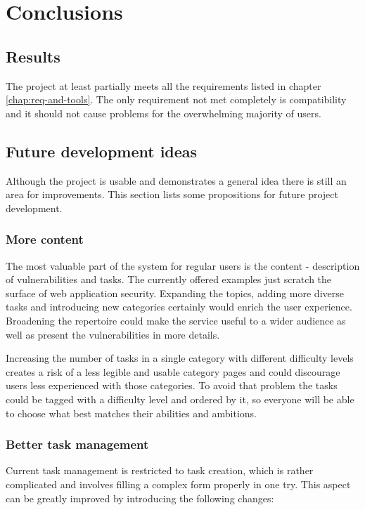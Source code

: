 \chapter{Conclusions}

\section{Results}

The project at least partially meets all the requirements listed in chapter \ref{chap:req-and-tools}. The only requirement not met completely is compatibility and it should not cause problems for the overwhelming majority of users.

\section{Future development ideas}

Although the project is usable and demonstrates a general idea there is still an area for improvements. This section lists some propositions for future project development.

\subsection{More content}

The most valuable part of the system for regular users is the content - description of vulnerabilities and tasks. The currently offered examples just scratch the surface of web application security. Expanding the topics, adding more diverse tasks and introducing new categories certainly would enrich the user experience. Broadening the repertoire could make the service useful to a wider audience as well as present the vulnerabilities in more details.

Increasing the number of tasks in a single category with different difficulty levels creates a risk of a less legible and usable category pages and could discourage users less experienced with those categories. To avoid that problem the tasks could be tagged with a difficulty level and ordered by it, so everyone will be able to choose what best matches their abilities and ambitions.

\subsection{Better task management}

Current task management is restricted to task creation, which is rather complicated and involves filling a complex form properly in one try. This aspect can be greatly improved by introducing the following changes:

